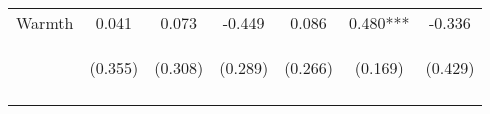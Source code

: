 \begin{tabular}{lcccccc}
\noalign{\smallskip}Warmth & 0.041 & 0.073 & -0.449 & 0.086 & 0.480*** & -0.336\\
 & \begin{footnotesize}(0.355)\end{footnotesize} & \begin{footnotesize}(0.308)\end{footnotesize} & \begin{footnotesize}(0.289)\end{footnotesize} & \begin{footnotesize}(0.266)\end{footnotesize} & \begin{footnotesize}(0.169)\end{footnotesize} & \begin{footnotesize}(0.429)\end{footnotesize}\\
\noalign{\smallskip}\hline\end{tabular}\\
